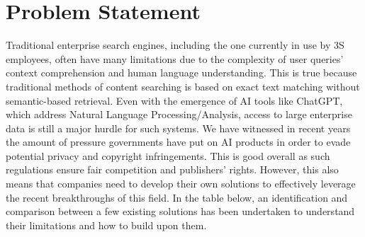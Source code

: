 \section{Problem Statement}
Traditional enterprise search engines, including the one currently in use by 3S employees, often have many limitations due to the complexity of user queries' context comprehension and human language understanding. This is true because traditional methods of content searching is based on exact text matching without semantic-based retrieval. Even with the emergence of AI tools like ChatGPT, which address Natural Language Processing/Analysis, access to large enterprise data is still a major hurdle for such systems. We have witnessed in recent years the amount of pressure governments have put on AI products in order to evade potential privacy and copyright infringements. This is good overall as such regulations ensure fair competition and publishers' rights. However, this also means that companies need to develop their own solutions to effectively leverage the recent breakthroughs of this field.\medskip\newline
In the table below, an identification and comparison between a few existing solutions has been undertaken to understand their limitations and how to build upon them.
